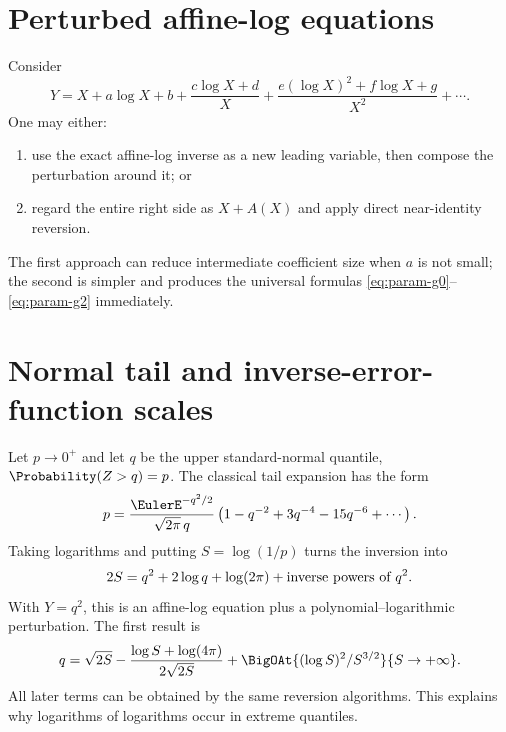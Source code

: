\documentclass[11pt,oneside]{book}
\theoremstyle{definition}
\theoremstyle{remark}
\begin{document}
\section{Perturbed affine-log equations}
Consider
\begin{equation}\label{eq:perturbed-affine-log}
 Y=X+a\log X+b+\frac{c\log X+d}{X}
 +\frac{e(\log X)^2+f\log X+g}{X^2}+\cdots.
\end{equation}
One may either:
\begin{enumerate}
\item use the exact affine-log inverse as a new leading variable, then compose
      the perturbation around it; or
\item regard the entire right side as $X+A(X)$ and apply direct near-identity
      reversion.
\end{enumerate}
The first approach can reduce intermediate coefficient size when $a$ is not
small; the second is simpler and produces the universal formulas
\eqref{eq:param-g0}--\eqref{eq:param-g2} immediately.

\section{Normal tail and inverse-error-function scales}
Let $p\to0^+$ and let $q$ be the upper standard-normal quantile,
$\Probability(Z>q)=p$.  The classical tail expansion has the form
\[
 p=\frac{\EulerE^{-q^2/2}}{\sqrt{2\pi}\,q}
 \left(1-q^{-2}+3q^{-4}-15q^{-6}+\cdots\right).
\]
Taking logarithms and putting $S=\log(1/p)$ turns the inversion into
\[
 2S=q^2+2\log q+\log(2\pi)+\hbox{inverse powers of }q^2.
\]
With $Y=q^2$, this is an affine-log equation plus a
polynomial--logarithmic perturbation.  The first result is
\begin{equation}\label{eq:normal-quantile-first}
 q=\sqrt{2S}
 -\frac{\log S+\log(4\pi)}{2\sqrt{2S}}
 +\BigOAt{(\log S)^2/S^{3/2}}{S\to+\infty}.
\end{equation}
All later terms can be obtained by the same reversion algorithms.  This
explains why logarithms of logarithms occur in extreme quantiles.
\end{document}
